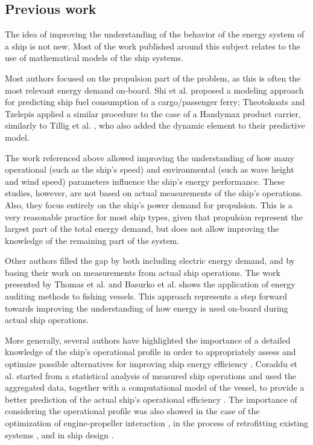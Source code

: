 \documentclass[preprint,12pt]{elsarticle}
\begin{document}
\subsection{Previous work}

The idea of improving the understanding of the behavior of the energy system of a ship is not new. Most of the work published around this subject relates to the use  of mathematical models of the ship systems. 

Most authors focused on the propulsion part of the problem, as this is often the most relevant energy demand on-board. Shi et al. \cite{Shi2009} proposed a modeling approach for predicting ship fuel consumption of a cargo/passenger ferry; Theotokoats and Tzelepis \cite{Theotokatos2015} applied a similar procedure to the case of a Handymax product carrier, similarly to Tillig et al. \cite{Tillig2016}, who also added the dynamic element to their predictive model. 

The work referenced above allowed improving the understanding of how many operational (such as the ship's speed) and environmental (such as wave height and wind speed) parameters influence the ship's energy performance. These studies, however, are not based on actual measurements of the ship's operations. Also, they focus entirely on the ship's power demand for propulsion. This is a very reasonable practice for most ship types, given that propulsion represent the largest part of the total energy demand, but does not allow improving the knowledge of the remaining part of the system.

Other authors filled the gap by both including electric energy demand, and by basing their work on measurements from actual ship operations. The work presented by Thomas et al. \cite{Thomas2010} and Basurko et al. \cite{Basurko2013} shows the application of energy auditing methods to fishing vessels. This approach represents a step forward towards improving the understanding of how energy is used on-board during actual ship operations.  

More generally, several authors have highlighted the importance of a detailed knowledge of the ship's operational profile in order to appropriately assess and optimize possible alternatives for improving ship energy efficiency \cite{Banks2013}. Coraddu et al. \cite{Coraddu2014} started from a statistical analysis of measured ship operations and used the aggregated data, together with a computational model of the vessel, to provide a better prediction of the actual ship's operational efficiency . The importance of considering the operational profile was also showed in the case of the optimization of engine-propeller interaction \cite{Baldi2015c}, in the process of retrofitting existing systems \cite{Baldi2015b,Choi2013}, and in ship design \cite{Ghassemi2017,Solem2015}. 
\end{document}

